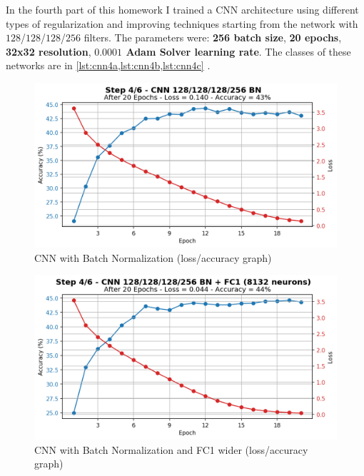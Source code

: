 \documentclass[a4paper, 11pt]{article}
\begin{document}
	In the fourth part of this homework I trained a CNN architecture using different types of regularization and improving techniques starting from the network with $128$/$128$/$128$/$256$ filters. The parameters were: \textbf{256 batch size}, \textbf{20 epochs}, \textbf{32x32 resolution}, \textbf{$\boldsymbol{0.0001}$ Adam Solver learning rate}. The classes of these networks are in \vref{lst:cnn4a,lst:cnn4b,lst:cnn4c} .
	\begin{figure}[ht!]
		\centering
		\includegraphics[width=0.62\paperwidth]{img/fig04a.png}
		\caption{CNN with Batch Normalization (loss/accuracy graph)}
		\label{fig:04a}
	\end{figure}
	\begin{figure}[ht!]
		\centering
		\includegraphics[width=0.62\paperwidth]{img/fig04b.png}
		\caption{CNN with Batch Normalization and FC1 wider (loss/accuracy graph)}
		\label{fig:04b}
	\end{figure}
\end{document}
